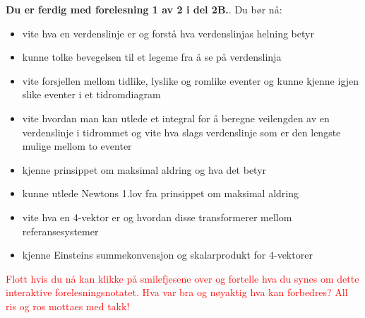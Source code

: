 \documentclass{beamer}
\let\hrefori\href
\renewcommand{\href}[2]{{\setlength{\fboxsep}{1pt}\colorbox{sunset}{\hrefori{#1}{#2}}}}
\newcommand{\pagebutton}[1]{\setbeamertemplate{button}{\tikz\node[inner xsep = 5pt, draw = structure!90, fill = green(ryb), rounded corners = 8pt]{\color{amber}\Large\insertbuttontext};}\beamerbutton{#1}}
\begin{document}
\begin{frame}
{

{\pagebutton{\small Forrige side}}\href{https://nettskjema.no/a/171403}{ \Changey[1][yellow]{-2}}
{\bf Du er ferdig med forelesning 1 av 2 i del 2B.}. Du bør nå:
\begin{itemize}
\item vite hva en verdenslinje er og forstå hva verdenslinjas helning betyr
\item kunne tolke bevegelsen til et legeme fra å se på verdenslinja
\item vite forsjellen mellom tidlike, lyslike og romlike eventer og kunne kjenne igjen slike eventer i et tidromdiagram
\item vite hvordan man kan utlede et integral for å beregne veilengden av en verdenslinje i tidrommet og vite hva slags verdenslinje som er den lengste mulige mellom to eventer
\item kjenne prinsippet om maksimal aldring og hva det betyr
\item kunne utlede Newtons 1.lov fra prinsippet om maksimal aldring
\item vite hva en 4-vektor er og hvordan disse transformerer mellom referansesystemer
\item kjenne Einsteins summekonvensjon og skalarprodukt for 4-vektorer
\end{itemize}
\textcolor{red}{Flott hvis du nå kan klikke på smilefjesene over og fortelle hva du synes om dette interaktive forelesningsnotatet. Hva var bra og nøyaktig hva kan forbedres? All ris og ros mottaes med takk!}
}



\end{frame}
\end{document}
